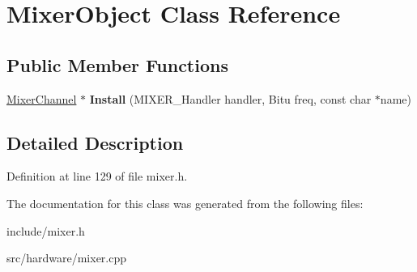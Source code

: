 \hypertarget{classMixerObject}{\section{Mixer\-Object Class Reference}
\label{classMixerObject}
}
\subsection*{Public Member Functions}
\begin{DoxyCompactItemize}
\item 
\hypertarget{classMixerObject_a69627e7e471b0afbc613a8d2b2b9221c}{\hyperlink{classMixerChannel}{Mixer\-Channel} $\ast$ {\bfseries Install} (M\-I\-X\-E\-R\-\_\-\-Handler handler, Bitu freq, const char $\ast$name)}\label{classMixerObject_a69627e7e471b0afbc613a8d2b2b9221c}

\end{DoxyCompactItemize}


\subsection{Detailed Description}


Definition at line 129 of file mixer.\-h.



The documentation for this class was generated from the following files\-:\begin{DoxyCompactItemize}
\item 
include/mixer.\-h\item 
src/hardware/mixer.\-cpp\end{DoxyCompactItemize}

